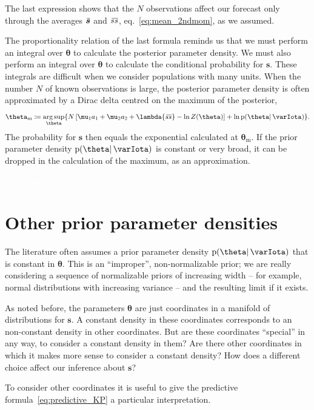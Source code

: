 \documentclass[\ifafour a4paper,12pt,\else a5paper,10pt,\fi%
onecolumn,oneside,article,%
british%
]{memoir}
\theoremstyle{remark}
\theoremstyle{innote}
\newcommand*{\defd}{\coloneqq}
\newcommand*{\pf}{\mathrm{p}}%
\renewcommand*{\|}{\mathpunct{|}}
\newcommand*{\eqn}{eq.}%
\newcommand*{\widebar}[1]{{\mkern1.5mu\skew{2}\overline{\mkern-1.5mu#1\mkern-1.5mu}\mkern 1.5mu}}
\DeclareMathOperator*{\argsup}{arg\,sup}
\newcommand*{\yI}{\varIota}
\newcommand*{\ys}{\bm{s}}
\newcommand*{\la}{\lambda}
\newcommand*{\yth}{\bm{\theta}}
\newcommand*{\ythm}{\yth_{\text{m}}}
\newcommand*{\yav}{\widebar{\bm{s}}}
\newcommand*{\ycv}{\widebar{ss}}
\begin{document}
The last expression shows that the $N$ observations affect our forecast
only through the averages $\yav$ and $\ycv$, \eqn~\eqref{eq:mean_2ndmom},
as we assumed.

The proportionality relation of the last formula reminds us that we must
perform an integral over $\yth$ to calculate the posterior parameter
density. We must also perform an integral over $\yth$ to calculate the
conditional probability for $\ys$. These integrals are difficult when we
consider populations with many units. When the number $N$ of known
observations is large, the posterior parameter density is often
approximated by a Dirac delta centred on the maximum of the posterior,
\begin{equation}
  \label{eq:max_posterior}
  \ythm \defd \argsup_{\yth}
  \{N\,[\mu_1 a_1 + \mu_2 a_2 + \la \ycv -\ln Z(\yth)]+
  \ln \pf(\yth \|\yI) \}.
\end{equation}
The probability for $\ys$ then equals the exponential calculated at
$\ythm$. If the prior parameter density $\pf(\yth \|\yI)$ is constant or
very broad, it can be dropped in the calculation of the maximum, as an
approximation.

\textcolor{white}{If you find this you can claim a postcard from me.}

\section{Other prior parameter densities}
\label{sec:other_priors}

The literature often assumes a prior parameter density $\pf(\yth \|\yI)$
that is constant in $\yth$. This is an \enquote{improper}, non-normalizable
prior; we are really considering a sequence of normalizable priors of
increasing width -- for example, normal distributions with increasing
variance -- and the resulting limit if it exists.

As noted before, the parameters $\yth$ are just coordinates in a manifold
of distributions for $\ys$. A constant density in these coordinates
corresponds to an non-constant density in other coordinates. But are these
coordinates \enquote{special} in any way, to consider a constant density in
them? Are there other coordinates in which it makes more sense to consider
a constant density? How does a different choice affect our inference about
$\ys$?

To consider other coordinates it is useful to give the predictive
formula~\eqref{eq:predictive_KP} a particular interpretation.
\end{document}
